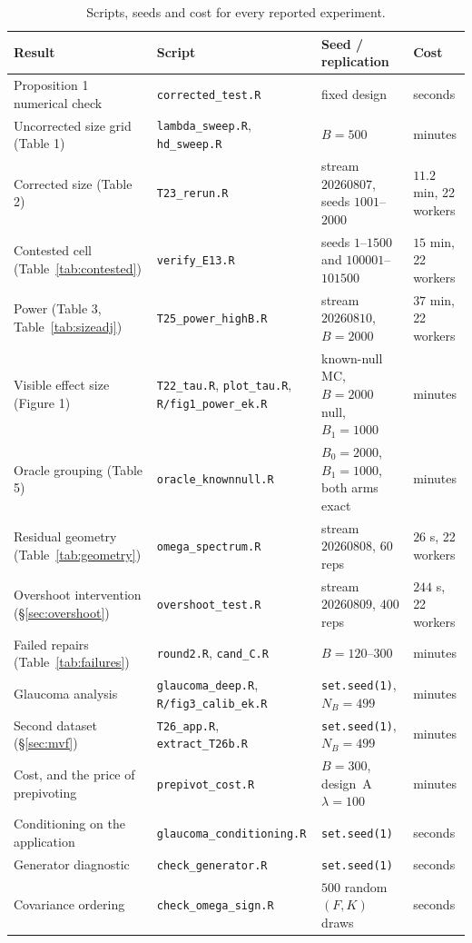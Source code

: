 \documentclass[11pt,a4paper]{article}
\theoremstyle{plain}
\theoremstyle{remark}
\begin{document}
\begin{table}[htbp]
\centering
\caption{Scripts, seeds and cost for every reported experiment.}
\label{tab:repro}
\small
\setlength{\tabcolsep}{4pt}
\begin{tabular}{p{4.0cm}p{4.3cm}p{4.0cm}p{2.2cm}}
\toprule
Result & Script & Seed / replication & Cost \\
\midrule
Proposition 1 numerical check & \texttt{corrected\_test.R} & fixed design & seconds \\
Uncorrected size grid (Table 1) & \texttt{lambda\_sweep.R}, \texttt{hd\_sweep.R}
  & $B = 500$ & minutes \\
Corrected size (Table 2) & \texttt{T23\_rerun.R}
  & stream $20260807$, seeds $1001$--$2000$ & $11.2$ min, 22 workers \\
Contested cell (Table~\ref{tab:contested}) & \texttt{verify\_E13.R}
  & seeds $1$--$1500$ and $100001$--$101500$ & $15$ min, 22 workers \\
Power (Table 3, Table~\ref{tab:sizeadj}) & \texttt{T25\_power\_highB.R}
  & stream $20260810$, $B = 2000$ & $37$ min, 22 workers \\
Visible effect size (Figure 1) & \texttt{T22\_tau.R}, \texttt{plot\_tau.R},
  \texttt{R/fig1\_power\_ek.R}
  & known-null MC, $B = 2000$ null, $B_1 = 1000$ & minutes \\
Oracle grouping (Table 5) & \texttt{oracle\_knownnull.R}
  & $B_0 = 2000$, $B_1 = 1000$, both arms exact & minutes \\
Residual geometry (Table~\ref{tab:geometry}) & \texttt{omega\_spectrum.R}
  & stream $20260808$, $60$ reps & $26$ s, 22 workers \\
Overshoot intervention (\S\ref{sec:overshoot}) & \texttt{overshoot\_test.R}
  & stream $20260809$, $400$ reps & $244$ s, 22 workers \\
Failed repairs (Table~\ref{tab:failures}) & \texttt{round2.R}, \texttt{cand\_C.R}
  & $B = 120$--$300$ & minutes \\
Glaucoma analysis & \texttt{glaucoma\_deep.R}, \texttt{R/fig3\_calib\_ek.R}
  & \texttt{set.seed(1)}, $N_B = 499$ & minutes \\
Second dataset (\S\ref{sec:mvf}) & \texttt{T26\_app.R}, \texttt{extract\_T26b.R}
  & \texttt{set.seed(1)}, $N_B = 499$ & minutes \\
Cost, and the price of prepivoting & \texttt{prepivot\_cost.R}
  & $B = 300$, design~A $\lambda = 100$ & minutes \\
Conditioning on the application & \texttt{glaucoma\_conditioning.R}
  & \texttt{set.seed(1)} & seconds \\
Generator diagnostic & \texttt{check\_generator.R}
  & \texttt{set.seed(1)} & seconds \\
Covariance ordering & \texttt{check\_omega\_sign.R}
  & $500$ random $(F,K)$ draws & seconds \\
\bottomrule
\end{tabular}
\end{table}
\end{document}
